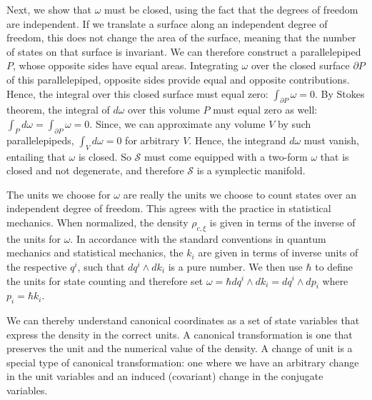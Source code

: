 \documentclass[12pt, english, twoside]{article} %
\begin{document}
Next, we show that $\omega$ must be closed, using the fact that the degrees of freedom are independent. If we translate a surface along an independent degree of freedom, this does not change the area of the surface, meaning that the number of states on that surface is invariant. We can therefore construct a parallelepiped $P$, whose opposite sides have equal areas. Integrating $\omega$ over the closed surface $\partial P$ of this parallelepiped, opposite sides provide equal and opposite contributions. Hence, the integral over this closed surface must equal zero: $\int_{\partial P} \omega =0$. By Stokes theorem, the integral of $d \omega$ over this volume $P$ must equal zero as well: $\int_P d \omega = \int_{\partial P} \omega =0$. Since, we can approximate any volume $V$ by such parallelepipeds, $\int_V d \omega = 0$ for arbitrary $V$. Hence, the integrand $d \omega$ must vanish, entailing that $\omega$ is closed. So $\mathcal{S}$ must come equipped with a two-form $\omega$ that is closed and not degenerate, and therefore $\mathcal{S}$ is a symplectic manifold.
 

The units we choose for $\omega$ are really the units we choose to count states over an independent degree of freedom. This agrees with the practice in statistical mechanics. When normalized, the density $\rho_{c, \xi}$ is given in terms of the inverse of the units for $\omega$. In accordance with the standard conventions in quantum mechanics and statistical mechanics, the $k_i$ are given in terms of inverse units of the respective $q^i$, such that $dq^i \wedge dk_i$ is a pure number. We then use $\hbar$ to define the units for state counting and therefore set $\omega = \hbar dq^i \wedge dk_i = dq^i \wedge dp_i$ where $p_i = \hbar k_i$.

We can thereby understand canonical coordinates as a set of state variables that express the density in the correct units. A canonical transformation is one that preserves the unit and the numerical value of the density. A change of unit is a special type of canonical transformation: one where we have an arbitrary change in the unit variables and an induced (covariant) change in the conjugate variables.
\end{document}
